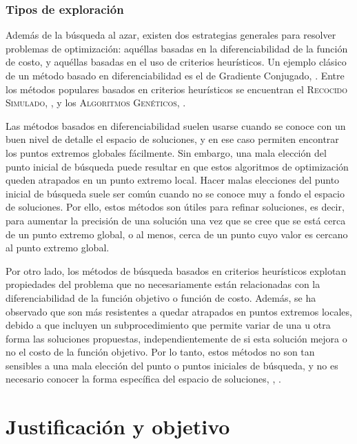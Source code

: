 \subsubsection{Tipos de exploración}

Además de la búsqueda al azar, existen dos estrategias generales para resolver problemas de optimización: aquéllas basadas en la diferenciabilidad de la función de costo, y aquéllas basadas en el uso de criterios heurísticos.
Un ejemplo clásico de un método basado en diferenciabilidad es el de Gradiente Conjugado, \citeauthor{numrecipesc} \citep{numrecipesc}. Entre los métodos populares basados en criterios heurísticos se encuentran el \textsc{Recocido Simulado}, \citeauthor{Kirkpatrick1983} \citep{Kirkpatrick1983}, y los \textsc{Algoritmos Genéticos}, \citeauthor{Goldberg1989} \citep{Goldberg1989}.

Las métodos basados en diferenciabilidad suelen usarse cuando se conoce con un buen nivel de detalle el espacio de soluciones, y en ese caso permiten encontrar los puntos extremos globales fácilmente. Sin embargo, una mala elección del punto inicial de búsqueda puede resultar en que estos algoritmos de optimización queden atrapados en un punto extremo local. Hacer malas elecciones del punto inicial de búsqueda suele ser común cuando no se conoce muy a fondo el espacio de soluciones. Por ello, estos métodos son útiles para refinar soluciones, es decir, para aumentar la precisión de una solución una vez que se cree que se está cerca de un punto extremo global, o al menos, cerca de un punto cuyo valor es cercano al punto extremo global.

Por otro lado, los métodos de búsqueda basados en criterios heurísticos explotan propiedades del problema que no necesariamente están relacionadas con la diferenciabilidad de la función objetivo o función de costo. Además, se ha observado que son más resistentes a quedar atrapados en puntos extremos locales, debido a que incluyen un subprocedimiento que permite variar de una u otra forma las soluciones propuestas, independientemente de si esta solución mejora o no el costo de la función objetivo. Por lo tanto, estos métodos no son tan sensibles a una mala elección del punto o puntos iniciales de búsqueda, y no es necesario conocer la forma específica del espacio de soluciones, \citeauthor{BangaMoles2003} \citep{BangaMoles2003}, \citeauthor{Storn1997} \citep{Storn1997}.

\section{Justificación y objetivo}

